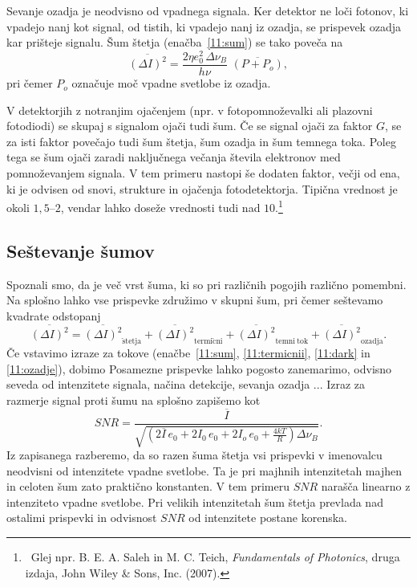 Sevanje ozadja je neodvisno od vpadnega signala. Ker detektor ne loči fotonov, ki 
vpadejo nanj kot signal, od tistih, ki vpadejo nanj iz ozadja, se prispevek ozadja 
kar prišteje signalu. Šum štetja (enačba~\ref{11:sum}) se tako poveča na
\begin{equation}
\overline{(\Delta I)^2} = \frac{2 \eta e_0^2\, \Delta\nu_B}{h\nu}\,\,
\overline{\left( P + P_o \right)},
\label{11:ozadje}
\end{equation}
pri čemer $P_o$ označuje moč vpadne svetlobe iz ozadja.

\begin{remark}
 V detektorjih z notranjim ojačenjem
 (npr. v fotopomnoževalki
  ali plazovni fotodiodi)
 se skupaj s signalom ojači tudi šum. Če se signal ojači za faktor $G$, se za isti faktor
 povečajo tudi šum štetja, šum ozadja in šum temnega toka. Poleg tega se šum ojači
 zaradi naključnega večanja števila elektronov med pomnoževanjem signala. V tem primeru nastopi
 še dodaten faktor, večji od ena, ki je odvisen od snovi, strukture in ojačenja fotodetektorja. 
 Tipična vrednost je okoli $1,5$--$2$, vendar lahko doseže vrednosti tudi nad 
 $10$.\footnote{~Glej npr. B. E. A. Saleh in M. C. Teich, 
{\it Fundamentals of Photonics}, druga izdaja, John Wiley \& Sons, Inc. (2007).}
\end{remark}

\subsection*{Seštevanje šumov}
Spoznali smo, da je več vrst šuma, ki so pri različnih pogojih različno pomembni.
Na splošno lahko vse prispevke združimo v skupni šum, pri čemer seštevamo kvadrate
odstopanj
\begin{equation}
\overline{(\Delta I)^2} = \overline{(\Delta I)^2}_{\mathrm{\check{s}tetja}} + 
\overline{(\Delta I)^2}_{\mathrm{termi\check{c}ni}} + \overline{(\Delta I)^2}_{\mathrm{temni~tok}} + 
\overline{(\Delta I)^2}_{\mathrm{ozadja}}.
\end{equation}
Če vstavimo izraze za tokove (enačbe~\ref{11:sum}, \ref{11:termicnii}, \ref{11:dark}
in \ref{11:ozadje}), dobimo
Posamezne prispevke lahko pogosto zanemarimo, odvisno seveda od intenzitete signala,
načina detekcije, sevanja ozadja ... Izraz za razmerje signal proti šumu na splošno 
zapišemo kot
\begin{equation}
SNR = \frac{\overline{I}}{\sqrt{\left( 2 \overline{I}\,e_0 + 2 I_0\,e_0
+ 2 I_o\,e_0 + \frac{4 kT}{R} \right) \Delta\nu_B}}.
\end{equation}
Iz zapisanega razberemo, da so razen šuma štetja vsi prispevki v 
imenovalcu neodvisni od intenzitete vpadne svetlobe. Ta je pri 
majhnih intenzitetah majhen in celoten šum 
zato praktično konstanten. V tem primeru $SNR$ narašča linearno z intenziteto
vpadne svetlobe. Pri velikih intenzitetah šum štetja prevlada nad ostalimi prispevki
in odvisnost $SNR$ od intenzitete postane korenska. 

